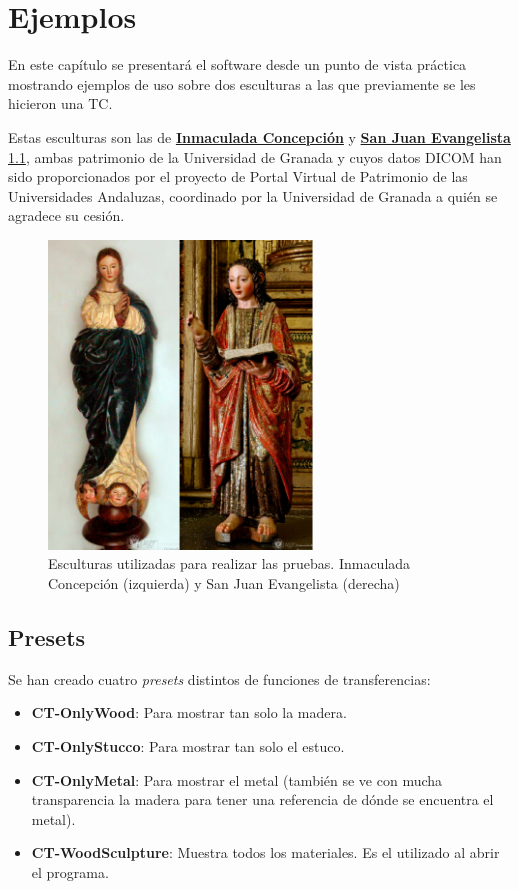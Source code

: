 \chapter{Ejemplos}

En este capítulo se presentará el software desde un punto de vista práctica mostrando ejemplos de uso sobre dos esculturas a las que previamente se les hicieron una TC.

Estas esculturas son las de \href{http://patrimonio3d.ugr.es/index.php/granada/escultura/item/18-inmaculada-concepcion}{\textbf{Inmaculada Concepción}} y \href{http://patrimonio3d.ugr.es/index.php/granada/escultura/item/6-san-juan-evangelista}{\textbf{San Juan Evangelista}} \ref{fig:figuras_reales}, ambas patrimonio de la Universidad de Granada y cuyos datos DICOM han sido proporcionados por el proyecto de Portal Virtual de Patrimonio de las Universidades Andaluzas, coordinado por la Universidad de Granada a quién se agradece su cesión.

\begin{figure}[H]
	\centering
	\includegraphics[width=7cm]{imagenes/figuras_reales}
	\caption{Esculturas utilizadas para realizar las pruebas. Inmaculada Concepción (izquierda) y San Juan Evangelista (derecha)}
	\label{fig:figuras_reales}
\end{figure}

\section{Presets}

Se han creado cuatro \textit{presets} distintos de funciones de transferencias:

\begin{itemize}
	\item \textbf{CT-OnlyWood}: Para mostrar tan solo la madera.
	\item \textbf{CT-OnlyStucco}: Para mostrar tan solo el estuco.
	\item \textbf{CT-OnlyMetal}: Para mostrar el metal (también se ve con mucha transparencia la madera para tener una referencia de dónde se encuentra el metal).
	\item \textbf{CT-WoodSculpture}: Muestra todos los materiales. Es el utilizado al abrir el programa.
\end{itemize}

